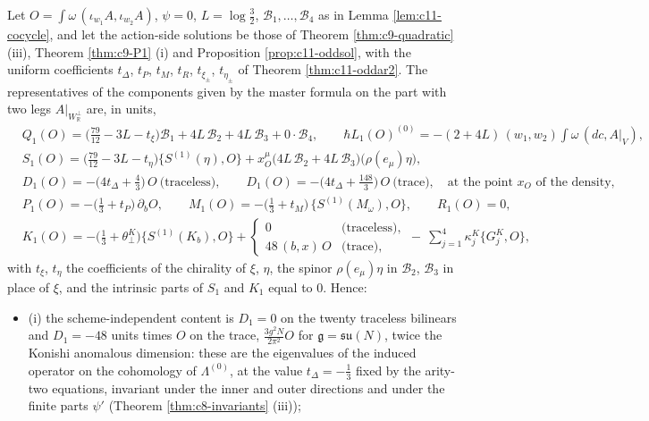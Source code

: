 \begin{corollary}
\label{cor:c11-F0}
Let $O=\int\omega\,(\iota_{w_1}A,\iota_{w_2}A)$, $\psi=0$, $L=\log\tfrac32$, $\mathcal B_1,\dots,\mathcal B_4$ as in Lemma \ref{lem:c11-cocycle}, and let the action-side solutions be those of Theorem \ref{thm:c9-quadratic} (iii), Theorem \ref{thm:c9-P1} (i) and Proposition \ref{prop:c11-oddsol}, with the uniform coefficients $t_\Delta$, $t_P$, $t_M$, $t_R$, $t_{\xi_\pm}$, $t_{\eta_\pm}$ of Theorem \ref{thm:c11-oddar2}. The representatives of the components given by the master formula on the part with two legs $A|_{W_{\mathbb R}^\perp}$ are, in units,
\[
\begin{aligned}
&Q_1(O)=\big(\tfrac{79}{12}-3L-t_\xi\big)\mathcal B_1+4L\,\mathcal B_2+4L\,\mathcal B_3+0\cdot\mathcal B_4,\qquad \hbar L_1(O)^{(0)}=-(2+4L)\,(w_1,w_2)\int\omega\,(dc,A|_V),\\
&S_1(O)=\big(\tfrac{79}{12}-3L-t_\eta\big)\{S^{(1)}(\eta),O\}+x_O^\mu\big(4L\,\mathcal B_2+4L\,\mathcal B_3\big)\big(\rho(e_\mu)\eta\big),\\
&D_1(O)=-\big(4t_\Delta+\tfrac43\big)\,O\ \text{(traceless)},\qquad D_1(O)=-\big(4t_\Delta+\tfrac{148}3\big)\,O\ \text{(trace)},\quad\text{at the point }x_O\text{ of the density},\\
&P_1(O)=-\big(\tfrac13+t_P\big)\,\partial_bO,\qquad M_1(O)=-\big(\tfrac13+t_M\big)\,\{S^{(1)}(M_\omega),O\},\qquad R_1(O)=0,\\
&K_1(O)=-\big(\tfrac13+\theta^K_\perp\big)\{S^{(1)}(K_b),O\}+\begin{cases}0&\text{(traceless)},\\ 48\,(b,x)\,O&\text{(trace)},\end{cases}\ -\ \sum_{j=1}^4\kappa^K_j\big\{G^K_j,O\big\},
\end{aligned}
\]
with $t_\xi$, $t_\eta$ the coefficients of the chirality of $\xi$, $\eta$, the spinor $\rho(e_\mu)\eta$ in $\mathcal B_2$, $\mathcal B_3$ in place of $\xi$, and the intrinsic parts of $S_1$ and $K_1$ equal to $0$. Hence:
\begin{itemize}
\item (i) the scheme-independent content is $D_1=0$ on the twenty traceless bilinears and $D_1=-48$ units times $O$ on the trace, $\frac{3g^2N}{2\pi^2}O$ for $\mathfrak g=\mathfrak{su}(N)$, twice the Konishi anomalous dimension: these are the eigenvalues of the induced operator on the cohomology of $\Lambda^{(0)}$, at the value $t_\Delta=-\tfrac13$ fixed by the arity-two equations, invariant under the inner and outer directions and under the finite parts $\psi'$ (Theorem \ref{thm:c8-invariants} (iii));

\end{itemize}
\end{corollary}
